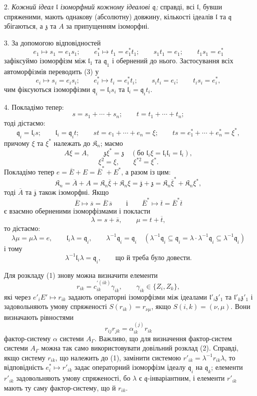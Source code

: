 \documentclass[11pt]{article}
\begin{document}
2. \emph{Кожний ідеал \(\mathfrak l\) ізоморфний кожному ідеалові \(\mathfrak q\);} справді, всі \(\mathfrak l\), бувши спряженими, мають однакову (абсолютну) довжину, кількості ідеалів \(\mathfrak l\) та \(\mathfrak q\) збігаються, а \(\mathfrak z\) та \(A\) за припущенням ізоморфні.

3. За допомогою відповідностей
\[
\tag{3}
e_1\mapsto s_1=e_1s_1;\qquad
e_1^*\mapsto t_1=e_1^*t_1;\qquad
s_1t_1=e_1;\qquad
t_1s_1=e_1^*
\]
зафіксуймо ізоморфізм між \(\mathfrak l_1\) та \(\mathfrak q_1\) і обернений до нього. Застосування всіх автоморфізмів переводить (3) у
\[
e_i\mapsto s_i=e_is_i;\qquad
e_i^*\mapsto t_i=e_i^*t_i;\qquad
s_it_i=e_i;\qquad
t_is_i=e_i^*,
\]
чим фіксуються ізоморфізми \(\mathfrak q_i=\mathfrak l_is_i\) та \(\mathfrak l_i=\mathfrak q_it_i\).

4. Покладімо тепер:
\[
s=s_1+\cdots+s_n;\qquad t=t_1+\cdots+t_n;
\]
тоді дістаємо:
\[
\mathfrak q_i=\mathfrak l_is;\qquad
\mathfrak l_i=\mathfrak q_it;\qquad
st=e_1+\cdots+e_n=\xi;\qquad
ts=e_1^*+\cdots+e_n^*=\xi^*,
\]
причому \(\xi\) та \(\xi^*\) належать до \(\mathfrak K_n\); маємо
\[
A\xi=A,\qquad \mathfrak z\xi^*=\mathfrak z\quad
(\text{бо }\mathfrak l_i\xi=\mathfrak l_i\mathfrak l_i=\mathfrak l_i),
\]
\[
\xi^2=\xi,\qquad \xi^{*2}=\xi^*.
\]
Покладімо тепер \(e=\overline E+E=\overline E^*+E^*\), а разом із цим:
\[
\mathfrak K_n=\overline A+A
=\mathfrak K_n\overline\xi+\mathfrak K_n\xi
=\overline{\mathfrak z}+\mathfrak z
=\mathfrak K_n\overline\xi^*+\mathfrak K_n\xi^*,
\]
тоді \(\overline A\) та \(\overline{\mathfrak z}\) також ізоморфні. Якщо
\[
\overline E\mapsto\overline s=\overline E\,\overline s
\qquad\text{і}\qquad
\overline E^*\mapsto\overline t=\overline E^*\overline t
\]
є взаємно оберненими ізоморфізмами і покласти
\[
\lambda=s+\overline s,\qquad \mu=t+\overline t,
\]
то дістаємо:
\[
\lambda\mu=\mu\lambda=e,\qquad
\mathfrak l_i\lambda=\mathfrak q_i,\qquad
\lambda^{-1}\mathfrak q_i=\mathfrak q_i
\quad
(\lambda^{-1}\mathfrak q_i\subseteq\mathfrak q_i
=\lambda\cdot\lambda^{-1}\mathfrak q_i\subseteq\lambda^{-1}\mathfrak q_i)
\]
і тому
\[
\lambda^{-1}\mathfrak l_i\lambda=\mathfrak q_i,\qquad \text{що й треба було довести.}
\]

Для розкладу (1) знову можна визначити елементи
\[
r_{ik}=c_{ik}^{\prime(ik)}\gamma_{ik},\qquad \gamma_{ik}\in\{Z_i,Z_k\},
\]
які через \(e'_iE'\mapsto r_{ik}\) задають операторні ізоморфізми між ідеалами \(\mathfrak l'_i\mathfrak z'_1\) та \(\mathfrak l'_k\mathfrak z'_1\) і задовольняють умову спряженості \(S(r_{ik})=r_{\nu\mu}\), якщо \(S(i,k)=(\nu,\mu)\). Вони визначають рівностями
\[
r_{ij}r_{jk}=\alpha_{ik}^{(j)}r_{ik}
\]
фактор-систему \(\alpha\) системи \(A_\Gamma\). Важливо, що для визначення фактор-систем системи \(A_\Gamma\) можна так само використовувати довільний розклад (2). Справді, якщо систему \(r_{ik}\), що належить до (1), замінити системою \(r'_{ik}=\lambda^{-1}r_{ik}\lambda\), то відповідність \(e_i^*\mapsto r'_{ik}\) задає операторний ізоморфізм ідеалу \(\mathfrak q_i\) на \(\mathfrak q_k\); елементи \(r'_{ik}\) задовольняють умову спряженості, бо \(\lambda\) є \(\mathfrak q\)-інваріантним, і елементи \(r'_{ik}\) мають ту саму фактор-систему, що й \(r_{ik}\).
\end{document}
